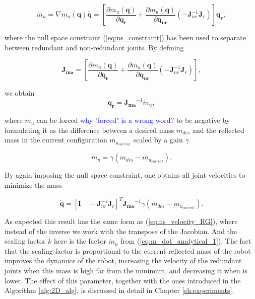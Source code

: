 \begin{equation}
{\dot{m}_u}=\nabla m_u(\mathbf{q}) \dot{\mathbf{q}} = \left[ \frac{\partial {m_u(\mathbf{q})}}{\partial{\mathbf{q_{r}}}} + \frac{\partial {m_u(\mathbf{q})}}{\partial{\mathbf{q_{nr}}}}  (- \mathbf{J}_{nr}^{-1} \mathbf{J}_r) \right ]  \mathbf{\dot{q}_r} ,
\label{eq:mass_expanded}
\end{equation}

where the null space constraint (\ref{eq:ns_constraint}) has been used to separate between redundant and non-redundant joints. By defining

\begin{equation}
\mathbf{J_{ma}} = \left[ \frac{\partial {m_u(\mathbf{q})}}{\partial{\mathbf{q_{r}}}} + \frac{\partial {m_u(\mathbf{q})}}{\partial{\mathbf{q_{nr}}}}  (- \mathbf{J}_{nr}^{-1} \mathbf{J}_r) \right ] ,
\label{eq:jma}
\end{equation}

we obtain 
\begin{equation}
\mathbf{\dot{q}_r} = \mathbf{J_{ma}}^{-1} {\dot{m}_u},
\label{eq:qr_jma}
\end{equation}

where ${\dot{m}_u}$ can be forced  \textcolor{blue}{why "forced" is a wrong word?} to be negative by formulating it as the difference between a desired mass $m_{des}$ and the reflected mass in the current configuration $m_{u_{current}}$ scaled by a gain $\gamma$


\begin{equation}
{\dot{m}_u} =  \gamma (m_{des} - m_{u_{current}}).
\label{eq:m_dot_analytical_1}
\end{equation}

By again imposing the null space constraint, one obtains all joint velocities to minimize the mass

\begin{equation}
\mathbf{\dot{q}} = [\mathbf{I} \quad  -\mathbf{J}_{nr}^{-1} \mathbf{J}_r]^T   \mathbf{J_{ma}}^{-1} \gamma (m_{des} - m_{u_{current}})  .
\label{eq:qdot_analytical}
\end{equation}

As expected this result has the same form as (\ref{eq:ns_velocity_RG}), where instead of the inverse we work with the transpose of the Jacobian. And the scaling factor $k$ here is the factor $\dot{m}_u$ from (\ref{eq:m_dot_analytical_1}). The fact that the scaling factor is proportional to the current reflected mass of the robot improves the dynamics of the robot, increasing the velocity of the redundant joints when this mass is high far from the minimum, and decreasing it when is lower. 
The effect of this parameter, together with the ones introduced in the Algorithm \ref{alg:2D_alg}, is discussed in detail in Chapter \ref{ch:experiments}.



